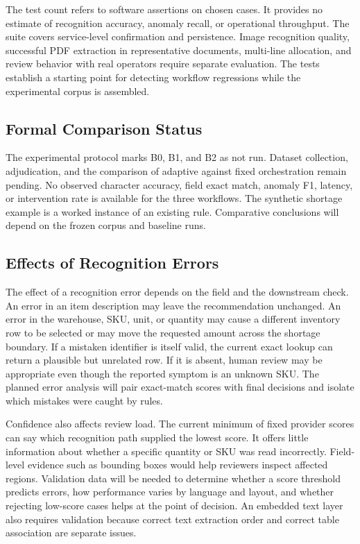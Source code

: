 \documentclass[conference]{IEEEtran}
\begin{document}
The test count refers to software assertions on chosen cases. It provides no estimate of recognition accuracy, anomaly recall, or operational throughput. The suite covers service-level confirmation and persistence. Image recognition quality, successful PDF extraction in representative documents, multi-line allocation, and review behavior with real operators require separate evaluation. The tests establish a starting point for detecting workflow regressions while the experimental corpus is assembled.

\subsection{Formal Comparison Status}
The experimental protocol marks B0, B1, and B2 as not run. Dataset collection, adjudication, and the comparison of adaptive against fixed orchestration remain pending. No observed character accuracy, field exact match, anomaly F1, latency, or intervention rate is available for the three workflows. The synthetic shortage example is a worked instance of an existing rule. Comparative conclusions will depend on the frozen corpus and baseline runs.

\subsection{Effects of Recognition Errors}
The effect of a recognition error depends on the field and the downstream check. An error in an item description may leave the recommendation unchanged. An error in the warehouse, SKU, unit, or quantity may cause a different inventory row to be selected or may move the requested amount across the shortage boundary. If a mistaken identifier is itself valid, the current exact lookup can return a plausible but unrelated row. If it is absent, human review may be appropriate even though the reported symptom is an unknown SKU. The planned error analysis will pair exact-match scores with final decisions and isolate which mistakes were caught by rules.

Confidence also affects review load. The current minimum of fixed provider scores can say which recognition path supplied the lowest score. It offers little information about whether a specific quantity or SKU was read incorrectly. Field-level evidence such as bounding boxes would help reviewers inspect affected regions. Validation data will be needed to determine whether a score threshold predicts errors, how performance varies by language and layout, and whether rejecting low-score cases helps at the point of decision. An embedded text layer also requires validation because correct text extraction order and correct table association are separate issues.
\end{document}
